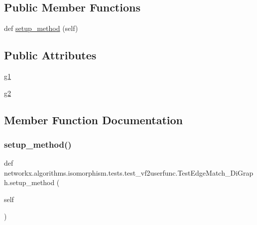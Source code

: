 \subsection*{Public Member Functions}
\begin{DoxyCompactItemize}
\item 
def \hyperlink{classnetworkx_1_1algorithms_1_1isomorphism_1_1tests_1_1test__vf2userfunc_1_1TestEdgeMatch__DiGraph_aaee34ba540bc5155e232c6577d0a50ac}{setup\+\_\+method} (self)
\end{DoxyCompactItemize}
\subsection*{Public Attributes}
\begin{DoxyCompactItemize}
\item 
\hyperlink{classnetworkx_1_1algorithms_1_1isomorphism_1_1tests_1_1test__vf2userfunc_1_1TestEdgeMatch__DiGraph_acbb53878bae2df984da66ad1da5d2f43}{g1}
\item 
\hyperlink{classnetworkx_1_1algorithms_1_1isomorphism_1_1tests_1_1test__vf2userfunc_1_1TestEdgeMatch__DiGraph_aeebc51c328d726556ddd40d276ba2f96}{g2}
\end{DoxyCompactItemize}


\subsection{Member Function Documentation}
\mbox{\label{classnetworkx_1_1algorithms_1_1isomorphism_1_1tests_1_1test__vf2userfunc_1_1TestEdgeMatch__DiGraph_aaee34ba540bc5155e232c6577d0a50ac}} 
\subsubsection{\texorpdfstring{setup\+\_\+method()}{setup\_method()}}
{\footnotesize\ttfamily def networkx.\+algorithms.\+isomorphism.\+tests.\+test\+\_\+vf2userfunc.\+Test\+Edge\+Match\+\_\+\+Di\+Graph.\+setup\+\_\+method (\begin{DoxyParamCaption}\item[{}]{self }\end{DoxyParamCaption})}



